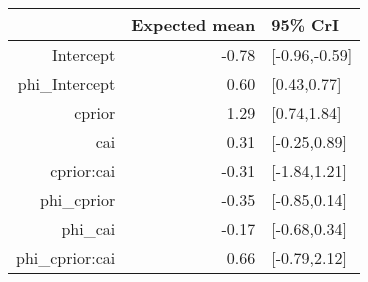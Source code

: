 \begin{tabular}{rrl}
  \hline
 & Expected mean & 95\% CrI \\ 
  \hline
Intercept & -0.78 & [-0.96,-0.59] \\ 
  phi\_Intercept & 0.60 & [0.43,0.77] \\ 
  cprior & 1.29 & [0.74,1.84] \\ 
  cai & 0.31 & [-0.25,0.89] \\ 
  cprior:cai & -0.31 & [-1.84,1.21] \\ 
  phi\_cprior & -0.35 & [-0.85,0.14] \\ 
  phi\_cai & -0.17 & [-0.68,0.34] \\ 
  phi\_cprior:cai & 0.66 & [-0.79,2.12] \\ 
   \hline
\end{tabular}

